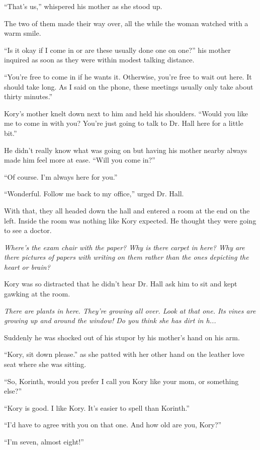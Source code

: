 \documentclass[9pt]{memoir}
\begin{document}
``That's us,'' whispered his mother as she stood up.

The two of them made their way over, all the while the woman watched with a warm smile.

``Is it okay if I come in or are these usually done one on one?'' his mother inquired as soon as they were within modest talking distance.

``You're free to come in if he wants it. Otherwise, you're free to wait out here. It should take long. As I said on the phone, these meetings usually only take about thirty minutes.''

Kory's mother knelt down next to him and held his shoulders. ``Would you like me to come in with you? You're just going to talk to Dr. Hall here for a little bit.''

He didn't really know what was going on but having his mother nearby always made him feel more at ease. ``Will you come in?''

``Of course. I'm always here for you.''

``Wonderful. Follow me back to my office,'' urged Dr. Hall.

With that, they all headed down the hall and entered a room at the end on the left. Inside the room was nothing like Kory expected. He thought they were going to see a doctor.

\textit{Where's the exam chair with the paper? Why is there carpet in here? Why are there pictures of papers with writing on them rather than the ones depicting the heart or brain?}

Kory was so distracted that he didn't hear Dr. Hall ask him to sit and kept gawking at the room.

\textit{There are plants in here. They're growing all over. Look at that one. Its vines are growing up and around the window! Do you think she has dirt in h...}

Suddenly he was shocked out of his stupor by his mother's hand on his arm.

``Kory, sit down please.'' as she patted with her other hand on the leather love seat where she was sitting.

``So, Korinth, would you prefer I call you Kory like your mom, or something else?''

``Kory is good. I like Kory. It's easier to spell than Korinth.''

``I'd have to agree with you on that one. And how old are you, Kory?''

``I'm seven, almost eight!''
\end{document}
